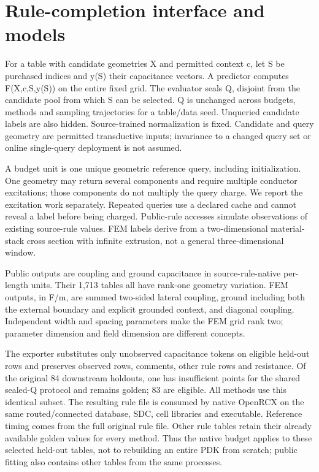 \documentclass[10pt,twocolumn]{article}
\begin{document}
\section*{Rule-completion interface and models}

For a table with candidate geometries X and permitted context c, let S be purchased indices and y(S) their capacitance vectors. A predictor computes F(X,c,S,y(S)) on the entire fixed grid. The evaluator seals Q, disjoint from the candidate pool from which S can be selected. Q is unchanged across budgets, methods and sampling trajectories for a table/data seed. Unqueried candidate labels are also hidden. Source-trained normalization is fixed. Candidate and query geometry are permitted transductive inputs; invariance to a changed query set or online single-query deployment is not assumed.

A budget unit is one unique geometric reference query, including initialization. One geometry may return several components and require multiple conductor excitations; those components do not multiply the query charge. We report the excitation work separately. Repeated queries use a declared cache and cannot reveal a label before being charged. Public-rule accesses simulate observations of existing source-rule values. FEM labels derive from a two-dimensional material-stack cross section with infinite extrusion, not a general three-dimensional window.

Public outputs are coupling and ground capacitance in source-rule-native per-length units. Their 1,713 tables all have rank-one geometry variation. FEM outputs, in F/m, are summed two-sided lateral coupling, ground including both the external boundary and explicit grounded context, and diagonal coupling. Independent width and spacing parameters make the FEM grid rank two; parameter dimension and field dimension are different concepts.

The exporter substitutes only unobserved capacitance tokens on eligible held-out rows and preserves observed rows, comments, other rule rows and resistance. Of the original 84 downstream holdouts, one has insufficient points for the shared sealed-Q protocol and remains golden; 83 are eligible. All methods use this identical subset. The resulting rule file is consumed by native OpenRCX on the same routed/connected database, SDC, cell libraries and executable. Reference timing comes from the full original rule file. Other rule tables retain their already available golden values for every method. Thus the native budget applies to these selected held-out tables, not to rebuilding an entire PDK from scratch; public fitting also contains other tables from the same processes.
\end{document}
